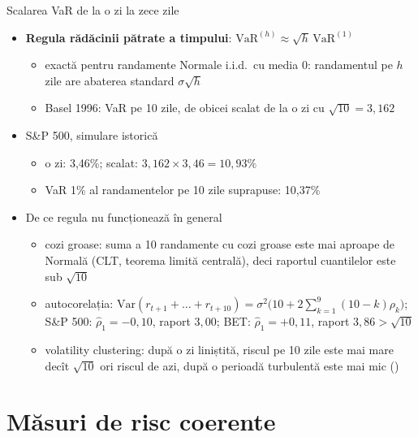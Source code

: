 \begin{frame}{Scalarea VaR de la o zi la zece zile}
\itemsize{\footnotesize}
\begin{itemize}
    \item \textbf{Regula rădăcinii pătrate a timpului}: $\mathrm{VaR}^{(h)} \approx \sqrt{h}\,\mathrm{VaR}^{(1)}$
    \begin{itemize}
        \item exactă pentru randamente Normale i.i.d.\ cu media 0: randamentul pe $h$ zile are abaterea standard $\sigma\sqrt{h}$
        \item Basel 1996: VaR pe 10 zile, de obicei scalat de la o zi cu $\sqrt{10} = 3{,}162$
    \end{itemize}
    \item S\&P 500, simulare istorică
    \begin{itemize}
        \item o zi: 3{,}46\%; scalat: $3{,}162 \times 3{,}46 = 10{,}93\%$
        \item VaR 1\% al randamentelor pe 10 zile suprapuse: 10{,}37\%
    \end{itemize}
    \item De ce regula nu funcționează în general
    \begin{itemize}
        \item cozi groase: suma a 10 randamente cu cozi groase este mai aproape de Normală (CLT, teorema limită centrală), deci raportul cuantilelor este sub $\sqrt{10}$
        \item autocorelația: $\mathrm{Var}(r_{t+1}+\dots+r_{t+10}) = \sigma^2\bigl(10 + 2\sum_{k=1}^{9}(10-k)\rho_k\bigr)$; S\&P 500: $\hat\rho_1 = -0{,}10$, raport $3{,}00$; BET: $\hat\rho_1 = +0{,}11$, raport $3{,}86 > \sqrt{10}$
        \item volatility clustering: după o zi liniștită, riscul pe 10 zile este mai mare decît $\sqrt{10}$ ori riscul de azi, după o perioadă turbulentă este mai mic ()
    \end{itemize}
\end{itemize}
\end{frame}


\section{Măsuri de risc coerente}

